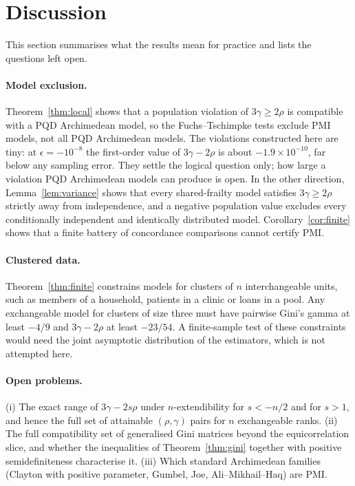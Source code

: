 \documentclass[11pt,a4paper]{article}
\theoremstyle{remark}
\begin{document}
\section{Discussion}\label{sec:discussion}
This section summarises what the results mean for practice and lists the questions left open.

\paragraph{Model exclusion.} Theorem~\ref{thm:local} shows that a population violation of $3\gamma\geq2\rho$ is compatible with a PQD Archimedean model, so the Fuchs--Tschimpke tests exclude PMI models, not all PQD Archimedean models. The violations constructed here are tiny: at $\epsilon=-10^{-8}$ the first-order value of $3\gamma-2\rho$ is about $-1.9\times10^{-10}$, far below any sampling error. They settle the logical question only; how large a violation PQD Archimedean models can produce is open. In the other direction, Lemma~\ref{lem:variance} shows that every shared-frailty model satisfies $3\gamma\geq2\rho$ strictly away from independence, and a negative population value excludes every conditionally independent and identically distributed model. Corollary~\ref{cor:finite} shows that a finite battery of concordance comparisons cannot certify PMI.

\paragraph{Clustered data.} Theorem~\ref{thm:finite} constrains models for clusters of $n$ interchangeable units, such as members of a household, patients in a clinic or loans in a pool. Any exchangeable model for clusters of size three must have pairwise Gini's gamma at least $-4/9$ and $3\gamma-2\rho$ at least $-23/54$. A finite-sample test of these constraints would need the joint asymptotic distribution of the estimators, which is not attempted here.

\paragraph{Open problems.} (i) The exact range of $3\gamma-2s\rho$ under $n$-extendibility for $s<-n/2$ and for $s>1$, and hence the full set of attainable $(\rho,\gamma)$ pairs for $n$ exchangeable ranks. (ii) The full compatibility set of generalised Gini matrices beyond the equicorrelation slice, and whether the inequalities of Theorem~\ref{thm:gini} together with positive semidefiniteness characterise it. (iii) Which standard Archimedean families (Clayton with positive parameter, Gumbel, Joe, Ali--Mikhail--Haq) are PMI.
\end{document}
